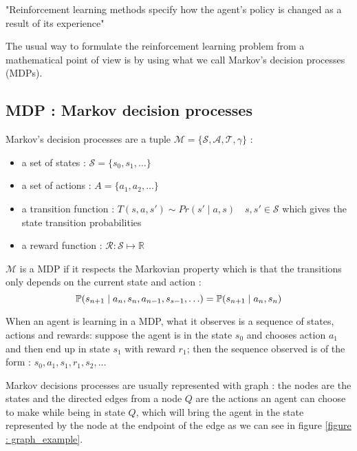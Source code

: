 \documentclass[14pt,a4paper]{article}
\theoremstyle{definition}
\begin{document}
"Reinforcement learning methods specify how the agent's policy is changed as a result of its experience"\citep{Sutton}



The usual way to formulate the reinforcement learning problem from a mathematical point of view is by using what we call Markov's decision processes (MDPs).

\subsection{MDP : Markov decision processes}



Markov's decision processes are a tuple \citep{Xia2015} $\mathcal{M}=\{\mathcal{S},\mathcal{A},\mathcal{T},\gamma\}$ : 

\begin{itemize}
\item a set of states : $\mathcal{S}=\{s_0,s_1,\ldots\}$
\item a set of actions  : $A=\{a_1,a_2,\ldots \}$
\item a transition function :  $T(s,a,s') \sim  Pr(s'\mid a, s) \quad s,s' \in \mathcal{S}$ which gives the state transition probabilities
\item a reward function : $\mathcal{R}:\mathcal{S}\mapsto \mathbb{R} $
\end{itemize}


$\mathcal{M}$ is a MDP if it respects the Markovian property which is that the transitions only depends on the current state and action : 
\begin{equation}
\mathbb{P}(s_{n+1}\mid a_{n},s_{n},a_{n-1},s_{s-1},\ldots)=\mathbb{P}(s_{n+1}\mid a_{n},s_{n})\\
\end{equation}

When an agent is learning in a MDP, what it observes is a sequence of states, actions and rewards: suppose the agent is in the state $s_0$ and chooses action $a_1$ and then end up in state $s_1$ with reward $r_1$; then the sequence observed is of the form : $s_0,a_1,s_1,r_1,s_2,\ldots$

Markov decisions processes are usually represented with graph : the nodes are the states and the directed edges from a node $Q$ are the actions an agent can choose to make while being in state $Q$, which will bring the agent in the state represented by the node at the endpoint of the edge as we can see in figure \ref{figure : graph_example}.
\end{document}
